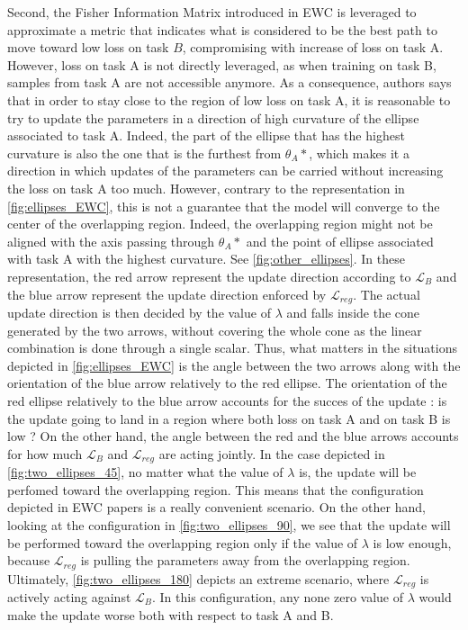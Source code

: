 \documentclass[11pt]{article}
\begin{document}
\vspace{2mm}
\noindent
Second, the Fisher Information Matrix introduced in EWC is leveraged to approximate a metric that indicates what is considered to be the best path to move toward low loss on task $B$, compromising with increase of loss on task A. However, loss on task A is not directly leveraged, as when training on task B, samples from task A are not accessible anymore. As a consequence, authors says that in order to stay close to the region of low loss on task A, it is reasonable to try to update the parameters in a direction of high curvature of the ellipse associated to task A. Indeed, the part of the ellipse that has the highest curvature is also the one that is the furthest from $\theta_A*$, which makes it a direction in which updates of the parameters can be carried without increasing the loss on task A too much. However, contrary to the representation in \ref{fig:ellipses_EWC}, this is not a guarantee that the model will converge to the center of the overlapping region. Indeed, the overlapping region might not be aligned with the axis passing through $\theta_A*$ and the point of ellipse associated with task A with the highest curvature. See \ref{fig:other_ellipses}. In these representation, the red arrow represent the update direction according to $\mathcal{L}_{B}$ and the blue arrow represent the update direction enforced by $\mathcal{L}_{reg}$. The actual update direction is then decided by the value of $\lambda$ and falls inside the cone generated by the two arrows, without covering the whole cone as the linear combination is done through a single scalar. Thus, what matters in the situations depicted in \ref{fig:ellipses_EWC} is the angle between the two arrows along with the orientation of the blue arrow relatively to the red ellipse. The orientation of the red ellipse relatively to the blue arrow accounts for the succes of the update : is the update going to land in a region where both loss on task A and on task B is low ? On the other hand, the angle between the red and the blue arrows accounts for how much $\mathcal{L}_{B}$ and $\mathcal{L}_{reg}$ are acting jointly. In the case depicted in \ref{fig:two_ellipses_45}, no matter what the value of $\lambda$ is, the update will be perfomed toward the overlapping region. This means that the configuration depicted in EWC papers is a really convenient scenario. On the other hand, looking at the configuration in \ref{fig:two_ellipses_90}, we see that the update will be performed toward the overlapping region only if the value of $\lambda$ is low enough, because $\mathcal{L}_{reg}$ is pulling the parameters away from the overlapping region. Ultimately, \ref{fig:two_ellipses_180} depicts an extreme scenario, where $\mathcal{L}_{reg}$ is actively acting against $\mathcal{L}_B$. In this configuration, any none zero value of $\lambda$ would make the update worse both with respect to task A and B.
\end{document}
